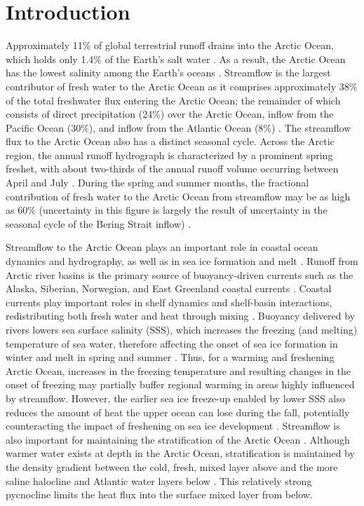 \section{Introduction}
\label{sec:intro_ch4}
Approximately 11\% of global terrestrial runoff drains into the Arctic Ocean, which holds only 1.4\% of the Earth's salt water \citep{Lewis_2000,Lammers_2001}.
As a result, the Arctic Ocean has the lowest salinity among the Earth's oceans \citep[e.g.][]{Steele_2001}.
Streamflow is the largest contributor of fresh water to the Arctic Ocean as it comprises approximately 38\% of the total freshwater flux entering the Arctic Ocean; the remainder of which consists of direct precipitation (24\%) over the Arctic Ocean, inflow from the Pacific Ocean (30\%), and inflow from the Atlantic Ocean (8\%) \citep{Serreze_2006a}.
The streamflow flux to the Arctic Ocean also has a distinct seasonal cycle.
Across the Arctic region, the annual runoff hydrograph is characterized by a prominent spring freshet, with about two-thirds of the annual runoff volume occurring between April and July \citep{Lammers_2001}.
During the spring and summer months, the fractional contribution of fresh water to the Arctic Ocean from streamflow may be as high as 60\% (uncertainty in this figure is largely the result of uncertainty in the seasonal cycle of the Bering Strait inflow) \citep{Serreze_2006a}.

Streamflow to the Arctic Ocean plays an important role in coastal ocean dynamics and hydrography, as well as in sea ice formation and melt \citep{Weatherly_1996,Rabe_2011,Fichot_2013}.
Runoff from Arctic river basins is the primary source of buoyancy-driven currents such as the Alaska, Siberian, Norwegian, and East Greenland coastal currents \citep[e.g.][]{Morison_2000,Boyd_2002,Maslowski_2002,McGeehan_2012,Myers_2005}.
Coastal currents play important roles in shelf dynamics and shelf-basin interactions, redistributing both fresh water and heat through mixing \citep[e.g.][]{Carmack_1989,Rudels_1999,Ekwurzel_2001,Maslowski_2014}.
Buoyancy delivered by rivers lowers sea surface salinity (SSS), which increases the freezing (and melting) temperature of sea water, therefore affecting the onset of sea ice formation in winter and melt in spring and summer \citep[e.g.][]{Weatherly_1996}.
Thus, for a warming and freshening Arctic Ocean, increases in the freezing temperature and resulting changes in the onset of freezing may partially buffer regional warming in areas highly influenced by streamflow.
However, the earlier sea ice freeze-up enabled by lower SSS also reduces the amount of heat the upper ocean can lose during the fall, potentially counteracting the impact of freshening on sea ice development \citep{Weatherly_1996,Morison_2012}.
Streamflow is also important for maintaining the stratification of the Arctic Ocean \citep{Nummelin_2015}.
Although warmer water exists at depth in the Arctic Ocean, stratification is maintained by the density gradient between the cold, fresh, mixed layer above and the more saline halocline and Atlantic water layers below \citep{Serreze_2006a}.
This relatively strong pycnocline limits the heat flux into the surface mixed layer from  below.


